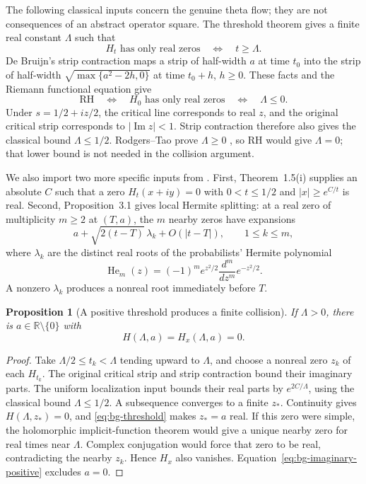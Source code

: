 \documentclass[11pt]{article}
\numberwithin{equation}{section}
\newtheorem{proposition}[theorem]{Proposition}
\theoremstyle{definition}
\theoremstyle{remark}
\DeclareMathOperator{\Ima}{Im}
\begin{document}
The following classical inputs concern the genuine theta flow; they are
not consequences of an abstract operator square. The threshold theorem
gives a finite real constant $\Lambda$ such that
\begin{equation}
 H_t\text{ has only real zeros}\quad\Longleftrightarrow\quad t\ge\Lambda.
 \label{eq:bg-threshold}
\end{equation}
De Bruijn's strip contraction maps a strip of half-width $a$ at time
$t_0$ into the strip of half-width
$\sqrt{\max\{a^2-2h,0\}}$ at time $t_0+h$, $h\ge0$.
These facts and the Riemann functional equation give
\begin{equation}
 \mathrm{RH}\quad\Longleftrightarrow\quad
 H_0\text{ has only real zeros}\quad\Longleftrightarrow\quad\Lambda\le0.
 \label{eq:bg-RH-threshold}
\end{equation}
Under $s=1/2+iz/2$, the critical line corresponds to real $z$,
and the original critical strip corresponds to $|\Ima z|<1$.
Strip contraction therefore also gives the classical bound $\Lambda\le1/2$.
Rodgers--Tao prove $\Lambda\ge0$ \cite{rodgerstao}, so RH would give
$\Lambda=0$; that lower bound is not needed in the collision argument.

We also import two more specific inputs from \cite{polymath}.
First, Theorem~1.5(i) supplies an absolute $C$ such that a zero
$H_t(x+iy)=0$ with $0<t\le1/2$ and $|x|\ge e^{C/t}$ is real.
Second, Proposition~3.1 gives local Hermite splitting: at a real zero
of multiplicity $m\ge2$ at $(T,a)$, the $m$ nearby zeros have expansions
\begin{equation}
 a+\sqrt{2(t-T)}\,\lambda_k+O(|t-T|),\qquad 1\le k\le m,
 \label{eq:bg-Hermite}
\end{equation}
where $\lambda_k$ are the distinct real roots of the probabilists'
Hermite polynomial
\[
 \operatorname{He}_m(z)=(-1)^m e^{z^2/2}
             \frac{d^m}{dz^m}e^{-z^2/2}.
\]
A nonzero $\lambda_k$
produces a nonreal root immediately before $T$.

\begin{proposition}[A positive threshold produces a finite collision]
\label{prop:bg-finite-collision}
If $\Lambda>0$, there is $a\in\mathbb R\setminus\{0\}$ with
\begin{equation}
 H(\Lambda,a)=H_x(\Lambda,a)=0.
 \label{eq:bg-positive-collision}
\end{equation}
\end{proposition}
\begin{proof}
Take $\Lambda/2\le t_k<\Lambda$ tending upward to $\Lambda$, and
choose a nonreal zero $z_k$ of each $H_{t_k}$. The original critical
strip and strip contraction bound their imaginary parts. The uniform
localization input bounds their real parts by $e^{2C/\Lambda}$, using
the classical bound $\Lambda\le1/2$. A subsequence converges to a finite
$z_*$. Continuity gives $H(\Lambda,z_*)=0$, and
\eqref{eq:bg-threshold} makes $z_*=a$ real. If this zero were simple,
the holomorphic implicit-function theorem would give a unique nearby
zero for real times near $\Lambda$. Complex conjugation would force
that zero to be real, contradicting the nearby $z_k$. Hence $H_x$ also
vanishes. Equation~\eqref{eq:bg-imaginary-positive} excludes $a=0$.
\end{proof}
\end{document}
